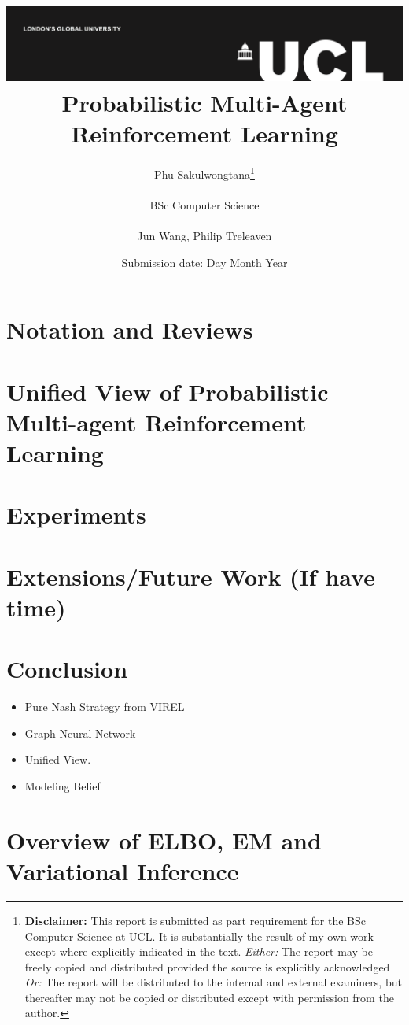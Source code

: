 \documentclass{report}
\title{{\vspace{-14em} \includegraphics[scale=0.4]{ucl_logo.png}}\\
{{\Huge Probabilistic Multi-Agent Reinforcement Learning}}\\
}
\date{Submission date: Day Month Year}
\author{Phu Sakulwongtana\thanks{
{\bf Disclaimer:}
This report is submitted as part requirement for the BSc Computer Science at UCL. It is
substantially the result of my own work except where explicitly indicated in the text.
\emph{Either:} The report may be freely copied and distributed provided the source is explicitly acknowledged
\newline  %
\emph{Or:}\newline
The report will be distributed to the internal and external examiners, but thereafter may not be copied or distributed except with permission from the author.}
\\ \\
BSc Computer Science\\ \\
Jun Wang, Philip Treleaven}
\begin{document}
 
\onehalfspacing
\maketitle
\begin{abstract}

\end{abstract}

\tableofcontents
\setcounter{page}{1}

\chapter{Notation and Reviews}


\chapter{Unified View of Probabilistic Multi-agent Reinforcement Learning}


% 

\chapter{Experiments}

\chapter{Extensions/Future Work (If have time)}


\chapter{Conclusion}
\begin{itemize}
    \item Pure Nash Strategy from VIREL
    \item Graph Neural Network 
    \item Unified View. 
    \item Modeling Belief 
\end{itemize}





\chapter{Overview of ELBO, EM and Variational Inference}


% 

% 
\end{document}
